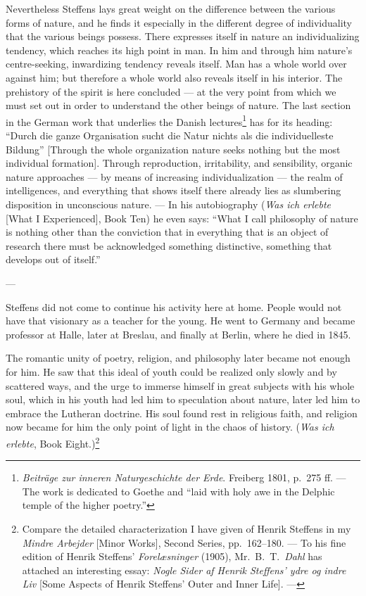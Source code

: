 \documentclass[12pt,a4paper]{book}
\newcommand{\opage}[1]{\marginnote{\footnotesize\textit{[#1]}}}
\begin{document}
Nevertheless Steffens lays great weight on the difference between the various forms
of nature, and he finds it especially in the different degree of individuality that
the various beings possess. There expresses itself in nature an individualizing
tendency, which reaches its high point in man. In him and through him \opage{46}nature's
centre-seeking, inwardizing tendency reveals itself. Man has a whole world over
against him; but therefore a whole world also reveals itself in his interior. The
prehistory of the spirit is here concluded --- at the very point from which we must
set out in order to understand the other beings of nature. The last section in the
German work that underlies the Danish lectures\footnote{\emph{Beiträge zur inneren
Naturgeschichte der Erde}. Freiberg 1801, p.~275 ff. --- The work is dedicated to
Goethe and ``laid with holy awe in the Delphic temple of the higher poetry.''} has
for its heading: ``Durch die ganze Organisation sucht die Natur nichts als die
individuelleste Bildung'' [Through the whole organization nature seeks nothing but
the most individual formation]. Through reproduction, irritability, and
sensibility, organic nature approaches --- by means of increasing individualization
--- the realm of intelligences, and everything that shows itself there already lies
as slumbering disposition in unconscious nature. --- In his autobiography
(\emph{Was ich erlebte} [What I Experienced], Book Ten) he even says: ``What I call
philosophy of nature is nothing other than the conviction that in everything that is
an object of research there must be acknowledged something distinctive, something
that develops out of itself.''

\begin{center}---\end{center}

Steffens did not come to continue his activity here at home. People would not have
that visionary as a teacher for the young. He went to Germany and became professor
at Halle, later at Breslau, and finally at Berlin, where he died in 1845.

The romantic unity of poetry, religion, and philosophy later became not enough for
him. He saw that this ideal of youth could be realized only slowly and by scattered
ways, and the urge to immerse himself in great subjects with his whole soul, which
in his youth had led him to speculation about nature, later led him to embrace the
Lutheran doctrine. His soul found rest in religious faith, and religion now became
for him the only point of light in the chaos of history. (\emph{Was ich erlebte},
Book Eight.)\footnote{Compare the detailed characterization I have given of Henrik
Steffens in my \emph{Mindre Arbejder} [Minor Works], Second Series, pp.~162--180.
--- To his fine edition of Henrik Steffens' \emph{Forelæsninger} (1905), Mr.\ B.\
T.\ \emph{Dahl} has attached an interesting essay: \emph{Nogle Sider af Henrik Steffens'
ydre og indre Liv} [Some Aspects of Henrik Steffens' Outer and Inner Life]. ---}
\end{document}
